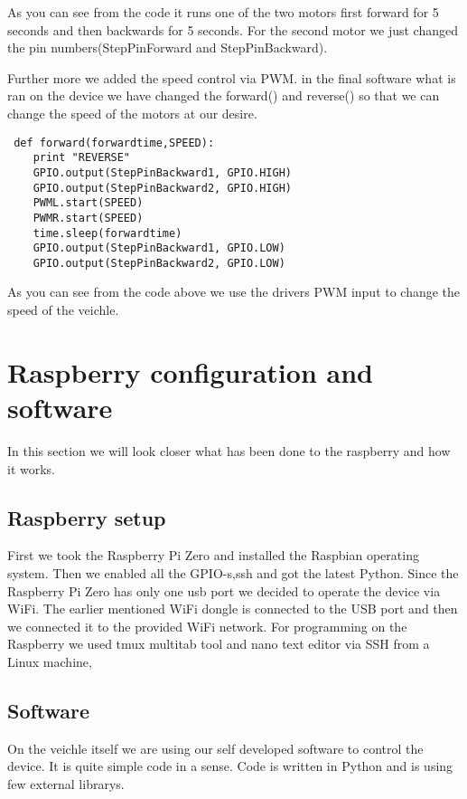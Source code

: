 As you can see from the code it runs one of the two motors first forward for 5 seconds and then backwards for 5 seconds.
For the second motor we just changed the pin numbers(StepPinForward and StepPinBackward).

Further more we added the speed control via PWM. 
in the final software what is ran on the device we have changed the forward() and reverse() so that we can change the speed of the motors at our desire.

\begin{lstlisting}
 def forward(forwardtime,SPEED):
	print "REVERSE"
	GPIO.output(StepPinBackward1, GPIO.HIGH)
	GPIO.output(StepPinBackward2, GPIO.HIGH)
	PWML.start(SPEED)
	PWMR.start(SPEED)
	time.sleep(forwardtime)
	GPIO.output(StepPinBackward1, GPIO.LOW)
	GPIO.output(StepPinBackward2, GPIO.LOW)
\end{lstlisting}

As you can see from the code above we use the drivers PWM input to change the speed of the veichle.

\section{Raspberry configuration and software}

In this section we will look closer what has been done to the raspberry and how it works.

\subsection{Raspberry setup}

First we took the Raspberry Pi Zero and installed the Raspbian operating system.
Then we enabled all the GPIO-s,ssh and got the latest Python.
Since the Raspberry Pi Zero has only one usb port we decided to operate the device via WiFi.
The earlier mentioned WiFi dongle is connected to the USB port and then we connected it to the provided WiFi network.
For programming on the Raspberry we used tmux multitab tool and nano text editor via SSH from a Linux machine,

\subsection{Software}

On the veichle itself we are using our self developed software to control the device.
It is quite simple code in a sense.
Code is written in Python and is using few external librarys.

